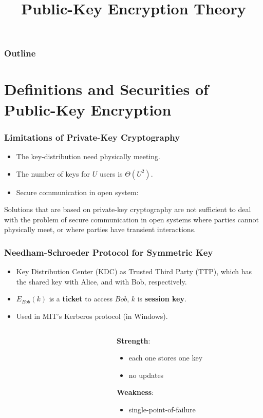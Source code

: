 

\title{Public-Key Encryption Theory}


\maketitle
\begin{frame}
\frametitle{Outline}
\tableofcontents
\end{frame}
\section{Definitions and Securities of Public-Key Encryption}
\begin{frame}\frametitle{Limitations of Private-Key Cryptography}
\begin{itemize}
\item The key-distribution need physically meeting.
\item The number of keys for $U$ users is $\Theta(U^2)$.
\item Secure communication in open system:
\end{itemize}
\vspace{0.5cm}
Solutions that are based on private-key cryptography are not sufficient to deal with the problem of secure communication in open systems where parties cannot physically meet, or where parties have transient interactions.
\end{frame}
\begin{frame}\frametitle{Needham-Schroeder Protocol for  Symmetric Key}
\begin{itemize}
\item Key Distribution Center (KDC) as Trusted Third Party (TTP), which has the shared key with Alice, and with Bob, respectively.
\item $E_{Bob}(k)$ is a \textbf{ticket} to access $Bob$, $k$ is \textbf{session key}.
\item Used in MIT's Kerberos protocol (in Windows).
\end{itemize}
\begin{columns}[t]
\begin{column}{5cm}
\begin{figure}[t]
\begin{center}

\end{center}
\end{figure}
\end{column}
\begin{column}{5cm}
\textbf{Strength}:
\begin{itemize}
\item each one stores one key
\item no updates
\end{itemize}
\textbf{Weakness}:
\begin{itemize}
\item single-point-of-failure
\end{itemize}
\end{column}
\end{columns}
\end{frame}

